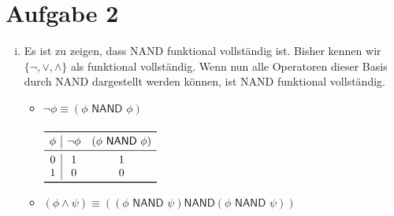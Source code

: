 \documentclass[a4paper,10pt]{article}
\begin{document}
\section*{Aufgabe 2}
\begin{enumerate}[(i)]
\item Es ist zu zeigen, dass \textsf{NAND} funktional vollständig ist. Bisher kennen wir $\{\lnot, \lor, \land\}$ als funktional vollständig. Wenn nun alle Operatoren dieser Basis durch \textsf{NAND} dargestellt werden können, ist \textsf{NAND} funktional vollständig.
\begin{itemize}
\item $\lnot\phi \equiv (\phi \textsf{ NAND } \phi)$ \\
\\
\begin{math}
\begin{array}{c|cc}
\toprule 
\phi & \lnot \phi & (\phi \textsf{ NAND } \phi) \\
\midrule
0 & 1 & 1 \\
1 & 0 & 0 \\
\bottomrule
\end{array}
\end{math}
\\
\item $(\phi \land \psi) \equiv ((\phi \textsf{ NAND } \psi) \textsf{NAND} (\phi \textsf{ NAND } \psi))$\\
\\
\begin{math}


\end{math}
\end{itemize}
\end{enumerate}
\end{document}
